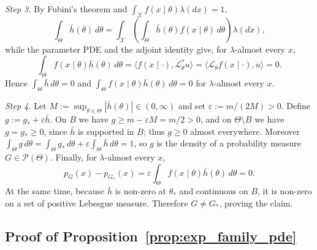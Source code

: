 \documentclass[11pt,twoside]{article} %
\begin{document}
\vspace{0.5 em}
\noindent
\emph{Step 3.}
By Fubini's theorem and $\int_{\mathcal X}f(x\mid\theta)\lambda(dx)=1$,
\begin{equation*}
    \int_\Theta \bar h(\theta)\,d\theta
    =\int_{\mathcal X}\left(\int_\Theta \bar h(\theta)f(x\mid\theta)\,d\theta\right)\lambda(dx),
\end{equation*}
while the parameter PDE and the adjoint identity give, for $\lambda$-almost every $x$,
\begin{equation*}
    \int_\Theta f(x\mid\theta)\bar h(\theta)\,d\theta
    =\langle f(x\mid\cdot),\mathcal L^*_\theta u\rangle
    =\langle \mathcal L_\theta f(x\mid\cdot),u\rangle=0 .
\end{equation*}
Hence $\int_\Theta\bar h\,d\theta=0$ and $\int_\Theta f(x\mid\theta)\bar h(\theta)\,d\theta=0$ for $\lambda$-almost every $x$.

\vspace{0.5 em}
\noindent
\emph{Step 4.}
Let $M:=\sup_{\theta\in\Theta}|\bar h(\theta)|\in(0,\infty)$ and set $\varepsilon:=m/(2M)>0$.
Define $g:=g_*+\varepsilon\bar h$. On $B$ we have $g\ge m-\varepsilon M=m/2>0$, and on $\Theta\setminus B$
we have $g=g_*\ge0$, since $\bar h$ is supported in $B$; thus $g\ge0$ almost everywhere. Moreover
$\int_\Theta g\,d\theta=\int_\Theta g_*\,d\theta+\varepsilon\int_\Theta\bar h\,d\theta=1$, so $g$ is the
density of a probability measure $G\in\mathcal P(\Theta)$. Finally, for $\lambda$-almost every $x$,
\begin{equation*}
    p_G(x)-p_{G_*}(x)=\varepsilon\int_\Theta f(x\mid\theta)\bar h(\theta)\,d\theta=0.
\end{equation*}
%
At the same time, because $\bar h$ is non-zero at $\theta_*$ and continuous on $B$, it is non-zero on a set of positive Lebesgue measure. Therefore $G\ne G_*$, proving the claim.

\subsection{Proof of Proposition~\ref{prop:exp_family_pde}}
\label{app:proof:prop_exp_family_pde}
\end{document}
